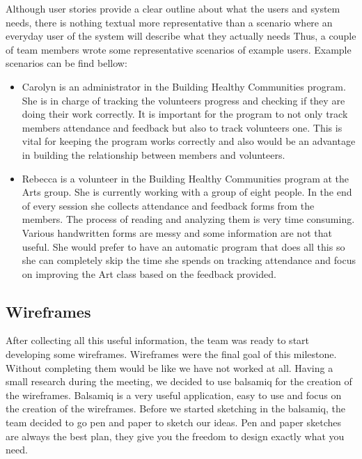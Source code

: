 \documentclass{l3proj}
\begin{document}
Although user stories provide a clear outline about what the users and system needs, there is nothing textual more representative than a scenario where an everyday user of the system will describe what they actually needs Thus, a couple of team members wrote some representative scenarios of example users. 
Example scenarios can be find bellow:
\begin{itemize}
\item Carolyn is an administrator in the Building Healthy Communities program. She is in charge of tracking the volunteers progress and checking if they are doing their work correctly. It is important for the program to not only track members attendance and feedback but also to track volunteers one. This is vital for keeping the program works correctly and also would be an advantage in building the relationship between members and volunteers.

\item Rebecca is a volunteer in the Building Healthy Communities program at the Arts group. She is currently working with a group of eight people. In the end of every session she collects attendance and feedback forms from the members. The process of reading and analyzing them is very time consuming. Various handwritten forms are messy and some information are not that useful. She would prefer to have an automatic program that does all this so she can completely skip the time she spends on tracking attendance and focus on improving the Art class based on the feedback provided.

\end{itemize}

\subsection{Wireframes}
\label{wireframes}

After collecting all this useful information, the team was ready to start developing some wireframes. Wireframes were the final goal of this milestone. Without completing them would be like we have not worked at all. Having a small research during the meeting, we decided to use balsamiq for the creation of the wireframes. Balsamiq is a very useful application, easy to use and focus on the creation of the wireframes. Before we started sketching in the balsamiq, the team decided to go pen and paper to sketch our ideas. Pen and paper sketches are always the best plan, they give you the freedom to design exactly what you need. 
\end{document}
